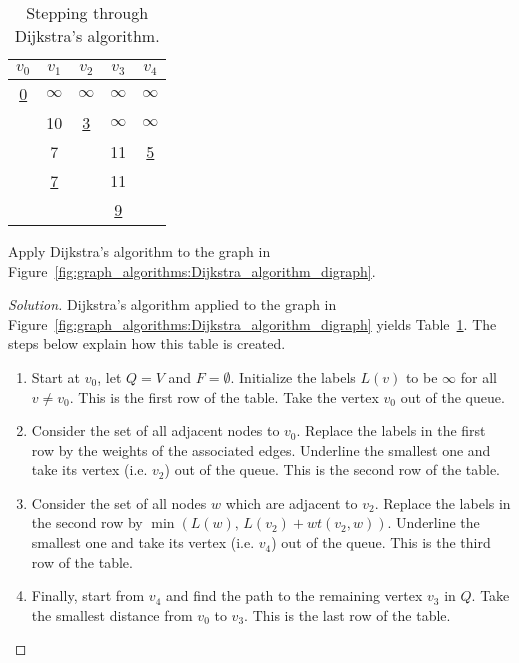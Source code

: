 \begin{table}[!htbp]
\centering
\begin{tabular}{|ccccc|} \hline
$v_0$         & $v_1$         & $v_2$         & $v_3$         & $v_4$ \\\hline\hline
\underline{0} & $\infty$      & $\infty$      & $\infty$      & $\infty$ \\
              & 10            & \underline{3} & $\infty$      & $\infty$ \\
              & 7             &               & 11            & \underline{5} \\
              & \underline{7} &               & 11            & \\
              &               &               & \underline{9} & \\\hline
\end{tabular}
\caption{Stepping through Dijkstra's algorithm.}
\label{tab:graph_algorithms:working_through_Dijkstra_algorithm}
\end{table}

\begin{example}
Apply Dijkstra's algorithm to the graph in
Figure~\ref{fig:graph_algorithms:Dijkstra_algorithm_digraph}.
\end{example}

\begin{proof}[Solution]
Dijkstra's algorithm applied to the graph in
Figure~\ref{fig:graph_algorithms:Dijkstra_algorithm_digraph} yields
Table~\ref{tab:graph_algorithms:working_through_Dijkstra_algorithm}. The
steps below explain how this table is created.
%
\begin{enumerate}
\item
Start at $v_0$, let $Q = V$ and $F = \emptyset$. Initialize the labels
$L(v)$ to be $\infty$ for all $v \neq v_0$. This is the first row of
the table. Take the vertex $v_0$ out of the queue.

\item
Consider the set of all adjacent nodes to $v_0$. Replace the labels in
the first row by the weights of the associated edges. Underline the
smallest one and take its vertex (i.e. $v_2$) out of the queue. This
is the second row of the table.

\item
Consider the set of all nodes $w$ which are adjacent to $v_2$. Replace
the labels in the second row by $\min(L(w),\, L(v_2) + wt(v_2, w))$.
Underline the smallest one and take its vertex (i.e. $v_4$) out of the
queue. This is the third row of the table.

\item
Finally, start from $v_4$ and find the path to the remaining vertex
$v_3$ in $Q$. Take the smallest distance from $v_0$ to $v_3$. This is
the last row of the table.
\end{enumerate}
\end{proof}

